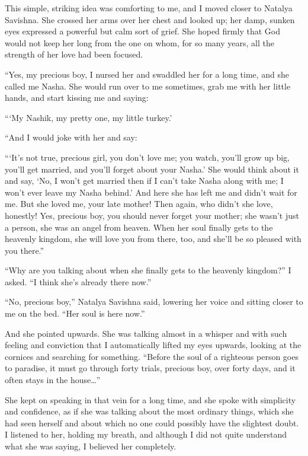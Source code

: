 This simple, striking idea was comforting to me, and I moved closer to Natalya Savishna. She crossed her arms over her chest and looked up; her damp, sunken eyes expressed a powerful but calm sort of grief. She hoped firmly that God would not keep her long from the one on whom, for so many years, all the strength of her love had been focused.

``Yes, my precious boy, I nursed her and swaddled her for a long time, and she called me Nasha. She would run over to me sometimes, grab me with her little hands, and start kissing me and saying: %

```My Nashik, my pretty one, my little turkey.' %

``And I would joke with her and say: %

```It's not true, precious girl, you don't love me; you watch, you'll grow up big, you'll get married, and you'll forget about your Nasha.' She would think about it and say, `No, I won't get married then if I can't take Nasha along with me; I won't ever leave my Nasha behind.' And here she has left me and didn't wait for me. But she loved me, your late mother! Then again, who didn't she love, honestly! Yes, precious boy, you should never forget your mother; she wasn't just a person, she was an angel from heaven. When her soul finally gets to the heavenly kingdom, she will love you from there, too, and she'll be so pleased with you there.'' %

``Why are you talking about when she finally gets to the heavenly kingdom?'' I asked. ``I think she's already there now.'' %

``No, precious boy,'' Natalya Savishna said, lowering her voice and sitting closer to me on the bed. ``Her soul is here now.'' %

And she pointed upwards. She was talking almost in a whisper and with such feeling and conviction that I automatically lifted my eyes upwards, looking at the cornices and searching for something. ``Before the soul of a righteous person goes to paradise, it must go through forty trials, precious boy, over forty days, and it often stays in the house\ldots{}'' %

She kept on speaking in that vein for a long time, and she spoke with simplicity and confidence, as if she was talking about the most ordinary things, which she had seen herself and about which no one could possibly have the slightest doubt. I listened to her, holding my breath, and although I did not quite understand what she was saying, I believed her completely.


